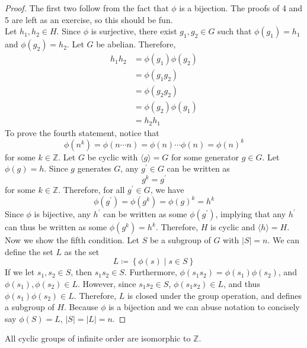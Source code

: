 \documentclass[12pt, letterpaper]{report}
\begin{document}
\begin{proof}
	The first two follow from the fact that \(\phi \) is a bijection. The proofs of 4 and 5 are left as an exercise, so this should be fun.\\
	Let \(h_1,h_2\in H\). Since \(\phi \) is surjective, there exist \(g_1,g_2\in G\) such that \(\phi (g_1)=h_1\) and \(\phi (g_2)=h_2\). Let \(G\) be abelian. Therefore,
	\begin{align*}
		h_1 h_2 &= \phi (g_1)\phi (g_2)\\
		&=\phi (g_1 g_2)\\
		&=\phi (g_2 g_2)\\
		&=\phi (g_2)\phi (g_1)\\
		&=h_2 h_1
	\end{align*}
	To prove the fourth statement, notice that
	\[
		\phi \left( n^k \right) =\phi (n\cdots n)=\phi (n)\cdots \phi (n)=\phi (n)^k
	\]
	for some \(k\in\mathbb{Z}\). Let \(G\) be cyclic with \(\langle g \rangle =G \) for some generator \(g\in G\). Let \(\phi (g)=h\). Since \(g\) generates \(G\), any \(g^{\prime} \in G\) can be written as
	\[
		g^k = g^{\prime} 
	\]
	for some \(k\in\mathbb{Z}\). Therefore, for all \(g^{\prime} \in G\), we have 
	\[
		\phi \left( g^{\prime}  \right) =\phi \left( g^k \right) =\phi (g)^k = h^k
	\]
	Since \(\phi \) is bijective, any \(h^{\prime} \) can be written as some \(\phi \left( g^{\prime}  \right) \), implying that any \(h^{\prime} \) can thus be written as some \(\phi \left( g^k \right)=h^k\). Therefore, \(H\) is cyclic and \(\langle h \rangle=H \).\\
	Now we show the fifth condition. Let \(S\) be a subgroup of \(G\) with \(\vert S \vert =n \). We can define the set \(L\) as the set 
	\[
		L\coloneqq \left\{ \phi (s) \mid s\in S \right\} 
	\]
	If we let \(s_1,s_2\in S\), then \(s_1 s_2 \in S\). Furthermore, \(\phi (s_1 s_2)=\phi (s_1)\phi (s_2)\), and \(\phi (s_1),\phi (s_2)\in L\). However, since \(s_1 s_2\in S\), \(\phi (s_1 s_2)\in L\), and thus \(\phi (s_1)\phi (s_2)\in L\). Therefore, \(L\) is closed under the group operation, and defines a subgroup of \(H\). Because \(\phi \) is a bijection and we can abuse notation to concisely say \(\phi (S)=L\), \(\vert S \vert=\vert L \vert  =n\).
\end{proof}
\begin{theorem}
	All cyclic groups of infinite order are isomorphic to \(\mathbb{Z}\).
\end{theorem}
\end{document}
